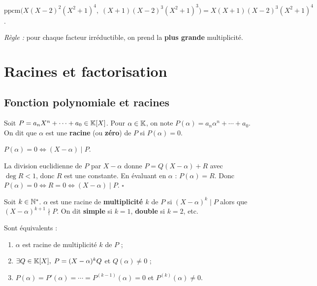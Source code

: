 \begin{exbox}
$\text{ppcm}\bigl(X(X-2)^2(X^2+1)^4,\; (X+1)(X-2)^3(X^2+1)^3\bigr) = X(X+1)(X-2)^3(X^2+1)^4$.

\textit{Règle :} pour chaque facteur irréductible, on prend la \textbf{plus grande} multiplicité.
\end{exbox}


\section{Racines et factorisation}

\subsection{Fonction polynomiale et racines}

\begin{defbox}[--- Racine]
Soit $P = a_n X^n + \cdots + a_0 \in \mathbb{K}[X]$. Pour $\alpha \in \mathbb{K}$, on note $P(\alpha) = a_n \alpha^n + \cdots + a_0$. On dit que $\alpha$ est une \textbf{racine} (ou \textbf{zéro}) de $P$ si $P(\alpha) = 0$.
\end{defbox}

\begin{propbox}
$P(\alpha) = 0 \iff (X - \alpha) \mid P$.
\end{propbox}

\begin{proofbox}
La division euclidienne de $P$ par $X - \alpha$ donne $P = Q(X - \alpha) + R$ avec $\deg R < 1$, donc $R$ est une constante. En évaluant en $\alpha$ : $P(\alpha) = R$. Donc $P(\alpha) = 0 \iff R = 0 \iff (X - \alpha) \mid P$. \hfill$\square$
\end{proofbox}

\begin{defbox}
Soit $k \in \mathbb{N}^*$. $\alpha$ est une racine de \textbf{multiplicité $k$} de $P$ si $(X - \alpha)^k \mid P$ alors que $(X - \alpha)^{k+1} \nmid P$. On dit \textbf{simple} si $k = 1$, \textbf{double} si $k = 2$, etc.
\end{defbox}

\begin{propbox}
Sont équivalents :
\begin{enumerate}[leftmargin=1.5cm]
  \item[(i)] $\alpha$ est racine de multiplicité $k$ de $P$ ;
  \item[(ii)] $\exists Q \in \mathbb{K}[X],\; P = (X - \alpha)^k Q$ et $Q(\alpha) \neq 0$ ;
  \item[(iii)] $P(\alpha) = P'(\alpha) = \cdots = P^{(k-1)}(\alpha) = 0$ et $P^{(k)}(\alpha) \neq 0$.
\end{enumerate}
\end{propbox}

